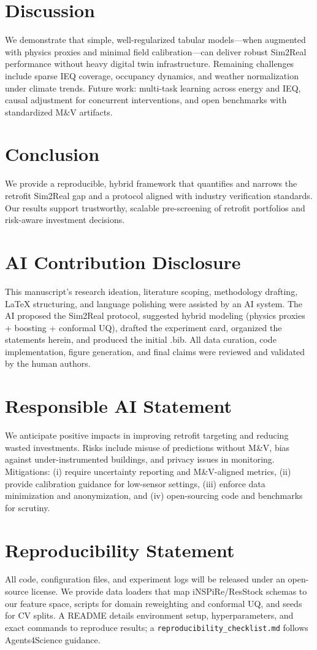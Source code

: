 ﻿\documentclass{article}
\begin{document}
\section{Discussion}
We demonstrate that simple, well-regularized tabular models—when augmented with physics proxies and minimal field calibration—can deliver robust Sim2Real performance without heavy digital twin infrastructure. Remaining challenges include sparse IEQ coverage, occupancy dynamics, and weather normalization under climate trends. Future work: multi-task learning across energy and IEQ, causal adjustment for concurrent interventions, and open benchmarks with standardized M\&V artifacts.

\section{Conclusion}
We provide a reproducible, hybrid framework that quantifies and narrows the retrofit Sim2Real gap and a protocol aligned with industry verification standards. Our results support trustworthy, scalable pre-screening of retrofit portfolios and risk-aware investment decisions.

\section*{AI Contribution Disclosure}
This manuscript's research ideation, literature scoping, methodology drafting, LaTeX structuring, and language polishing were assisted by an AI system. The AI proposed the Sim2Real protocol, suggested hybrid modeling (physics proxies + boosting + conformal UQ), drafted the experiment card, organized the statements herein, and produced the initial .bib. All data curation, code implementation, figure generation, and final claims were reviewed and validated by the human authors.

\section*{Responsible AI Statement}
We anticipate positive impacts in improving retrofit targeting and reducing wasted investments. Risks include misuse of predictions without M\&V, bias against under-instrumented buildings, and privacy issues in monitoring. Mitigations: (i) require uncertainty reporting and M\&V-aligned metrics, (ii) provide calibration guidance for low-sensor settings, (iii) enforce data minimization and anonymization, and (iv) open-sourcing code and benchmarks for scrutiny.

\section*{Reproducibility Statement}
All code, configuration files, and experiment logs will be released under an open-source license. We provide data loaders that map iNSPiRe/ResStock schemas to our feature space, scripts for domain reweighting and conformal UQ, and seeds for CV splits. A README details environment setup, hyperparameters, and exact commands to reproduce results; a \texttt{reproducibility\_checklist.md} follows Agents4Science guidance.



\end{document}
